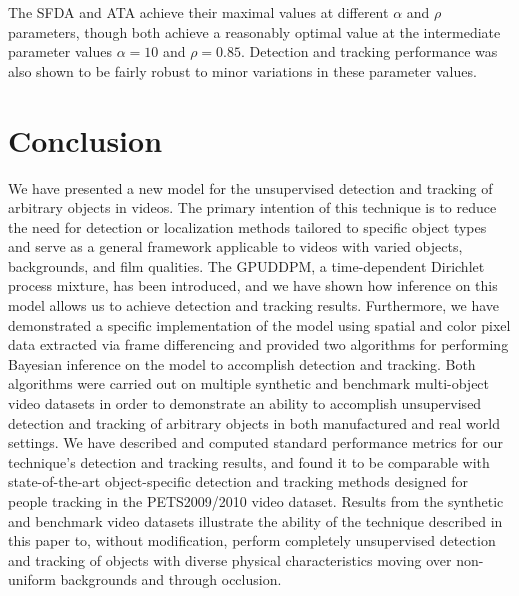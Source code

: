 \documentclass[twocolumn, final]{svjour3}
\begin{document}
The SFDA and ATA achieve their maximal values at different $\alpha$ and $\rho$ parameters, though both achieve a reasonably optimal value at the intermediate parameter values $\alpha = 10$ and $\rho = 0.85$. Detection and tracking performance was also shown to be fairly robust to minor variations in these parameter values.



\section{Conclusion}
\label{sec:conclusion}

We have presented a new model for the unsupervised detection and tracking of arbitrary objects in videos. The primary intention of this technique is to reduce the need for detection or localization methods tailored to specific object types and serve as a general framework applicable to videos with varied objects, backgrounds, and film qualities. The GPUDDPM, a time-dependent Dirichlet process mixture, has been introduced, and we have shown how inference on this model allows us to achieve detection and tracking results. Furthermore, we have demonstrated a specific implementation of the model using spatial and color pixel data extracted via frame differencing and provided two algorithms for performing Bayesian inference on the model to accomplish detection and tracking. Both algorithms were carried out on multiple synthetic and benchmark multi-object video datasets in order to demonstrate an ability to accomplish unsupervised detection and tracking of arbitrary objects in both manufactured and real world settings. We have described and computed standard performance metrics for our technique's detection and tracking results, and found it to be comparable with state-of-the-art object-specific detection and tracking methods designed for people tracking in the PETS2009/2010 video dataset. Results from the synthetic and benchmark video datasets illustrate the ability of the technique described in this paper to, without modification, perform completely unsupervised detection and tracking of objects with diverse physical characteristics moving over non-uniform backgrounds and through occlusion.


\begin{small}

 
\end{small}
\end{document}
